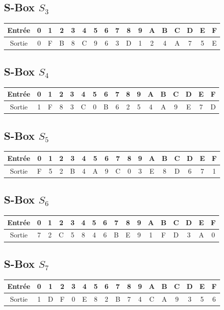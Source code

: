 \documentclass[12pt,a4paper]{report}
\begin{document}
\subsection*{S-Box $S_3$}
\begin{center}
\begin{tabular}{|c|cccccccccccccccc|}
\hline
Entrée & 0 & 1 & 2 & 3 & 4 & 5 & 6 & 7 & 8 & 9 & A & B & C & D & E & F \\
\hline
Sortie & 0 & F & B & 8 & C & 9 & 6 & 3 & D & 1 & 2 & 4 & A & 7 & 5 & E \\
\hline
\end{tabular}
\end{center}

\subsection*{S-Box $S_4$}
\begin{center}
\begin{tabular}{|c|cccccccccccccccc|}
\hline
Entrée & 0 & 1 & 2 & 3 & 4 & 5 & 6 & 7 & 8 & 9 & A & B & C & D & E & F \\
\hline
Sortie & 1 & F & 8 & 3 & C & 0 & B & 6 & 2 & 5 & 4 & A & 9 & E & 7 & D \\
\hline
\end{tabular}
\end{center}

\subsection*{S-Box $S_5$}
\begin{center}
\begin{tabular}{|c|cccccccccccccccc|}
\hline
Entrée & 0 & 1 & 2 & 3 & 4 & 5 & 6 & 7 & 8 & 9 & A & B & C & D & E & F \\
\hline
Sortie & F & 5 & 2 & B & 4 & A & 9 & C & 0 & 3 & E & 8 & D & 6 & 7 & 1 \\
\hline
\end{tabular}
\end{center}

\subsection*{S-Box $S_6$}
\begin{center}
\begin{tabular}{|c|cccccccccccccccc|}
\hline
Entrée & 0 & 1 & 2 & 3 & 4 & 5 & 6 & 7 & 8 & 9 & A & B & C & D & E & F \\
\hline
Sortie & 7 & 2 & C & 5 & 8 & 4 & 6 & B & E & 9 & 1 & F & D & 3 & A & 0 \\
\hline
\end{tabular}
\end{center}

\subsection*{S-Box $S_7$}
\begin{center}
\begin{tabular}{|c|cccccccccccccccc|}
\hline
Entrée & 0 & 1 & 2 & 3 & 4 & 5 & 6 & 7 & 8 & 9 & A & B & C & D & E & F \\
\hline
Sortie & 1 & D & F & 0 & E & 8 & 2 & B & 7 & 4 & C & A & 9 & 3 & 5 & 6 \\
\hline
\end{tabular}
\end{center}
\end{document}
